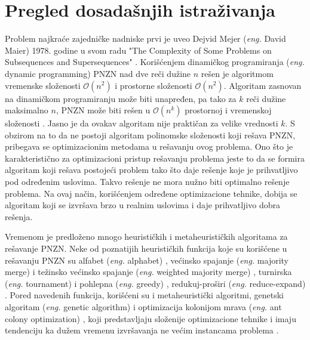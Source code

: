 \documentclass[12pt,oneside]{memoir}
\begin{document}
\section{Pregled dosadašnjih istraživanja}
Problem najkraće zajedničke nadniske prvi je uveo Dejvid Mejer (\textit{eng.} David Maier) 1978. godine u svom radu 
"The Complexity of Some Problems on Subsequences and Supersequences" \cite{Maier}. Korišćenjem dinamičkog
programiranja (\textit{eng.} dynamic programming) PNZN nad dve reči dužine $n$ rešen je algoritmom vremenske 
složenosti $\mathcal{O}(n^{2})$ i prostorne složenosti $\mathcal{O}(n^{2})$. Algoritam zasnovan na dinamičkom programiranju
može biti unapređen, pa tako za $k$ reči dužine maksimalno $n$, PNZN može biti rešen u $\mathcal{O}(n^{k})$ prostornoj i 
vremenskoj složenosti \cite{SCSDinamicProg}. Jasno je da ovakav algoritam nije praktičan za velike vrednosti $k$. S obzirom na to da ne postoji 
algoritam polinomske složenosti koji rešava PNZN, pribegava se optimizacionim metodama u rešavanju ovog problema.
Ono što je karakteristično za optimizacioni pristup rešavanju problema jeste to da se formira algoritam koji rešava
postojeći problem tako što daje rešenje koje je prihvatljivo pod određenim uslovima. Takvo rešenje ne mora nužno biti
optimalno rešenje problema. Na ovaj način, korišćenjem određene optimizacione tehnike, dobija se algoritam koji se izvršava
brzo u realnim uslovima i daje prihvatljivo dobra rešenja.

Vremenom je predloženo mnogo heurističkih i metaheurističkih algoritama za rešavanje PNZN.
Neke od poznatijih heurističkih funkcija koje su korišćene u rešavanju PNZN su alfabet (\textit{eng.} alphabet) \cite{AlphabetSCS}, većinsko spajanje (\textit{eng.} majority merge) 
i težinsko većinsko spajanje (\textit{eng.} weighted majority merge) \cite{ProbabilisticBS}, turnirska (\textit{eng.} tournament) i pohlepna (\textit{eng.} greedy) \cite{Tournament},
redukuj-proširi (\textit{eng.} reduce-expand) \cite{AlphabetSCS}. Pored navedenih funkcija, korišćeni su i metaheuristički algoritmi, genetski algoritam (\textit{eng.} genetic algorithm) \cite{SCSGenetic} i 
optimizacija kolonijom mrava (\textit{eng.} ant colony optimization) \cite{SCSColony}, koji predstavljaju složenije optimizacione tehnike i imaju
tendenciju ka dužem vremenu izvršavanja ne većim instancama problema \cite{SCSSBetterSolution}.
\end{document}
